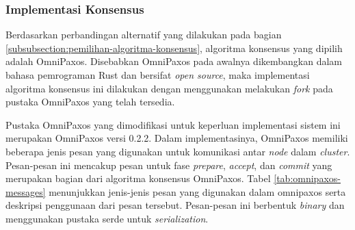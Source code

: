 \subsubsection{Implementasi Konsensus}
\label{subsubsection:implementasi-konsensus}

Berdasarkan perbandingan alternatif yang dilakukan pada bagian \ref{subsubsection:pemilihan-algoritma-konsensus}, algoritma konsensus yang dipilih adalah OmniPaxos. Disebabkan OmniPaxos pada awalnya dikembangkan dalam bahasa pemrograman Rust dan bersifat \textit{open source}, maka implementasi algoritma konsensus ini dilakukan dengan menggunakan melakukan \textit{fork} pada pustaka OmniPaxos yang telah tersedia.

Pustaka OmniPaxos yang dimodifikasi untuk keperluan implementasi sistem ini merupakan OmniPaxos versi 0.2.2. Dalam implementasinya, OmniPaxos memiliki beberapa jenis pesan yang digunakan untuk komunikasi antar \textit{node} dalam \textit{cluster}. Pesan-pesan ini mencakup pesan untuk fase \textit{prepare}, \textit{accept}, dan \textit{commit} yang merupakan bagian dari algoritma konsensus OmniPaxos. Tabel \ref{tab:omnipaxos-messages} menunjukkan jenis-jenis pesan yang digunakan dalam omnipaxos serta deskripsi penggunaan dari pesan tersebut. Pesan-pesan ini berbentuk \textit{binary} dan menggunakan pustaka serde untuk \textit{serialization}.

